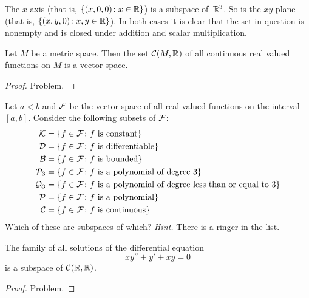 \begin{exam}  The $x$-axis (that is, $\{(x,0,0) \colon x \in \mathbb{R}\}$) is a subspace of~$\mathbb{R}^3$.
So is the $xy$-plane (that is, $\{(x,y,0) \colon x,y \in \mathbb{R}\}$).  In both cases it is clear
that the set in question is nonempty and is closed under addition and scalar multiplication.
\end{exam}

\begin{exam} Let $M$ be a metric space.  Then the set $\mathcal{C}(M,\mathbb{R})$ of all continuous real
valued functions on $M$ is a vector space.
\end{exam}

\begin{proof} Problem.  \ns   \end{proof}

\begin{prob} Let $a < b$ and $\mathcal{F}$ be the vector space of all real valued functions on the
interval $[a,b]$.  Consider the following subsets of $\mathcal{F}$:
 \begin{align*}   \mathcal{K}    &=  \{f \in \mathcal{F} \colon \text{$f$ is constant}\} \\
                  \mathcal{D}    &=  \{f \in \mathcal{F} \colon \text{$f$ is differentiable}\} \\
                  \mathcal{B}    &=  \{f \in \mathcal{F} \colon \text{$f$ is bounded}\} \\
                  \mathcal{P}_3  &=  \{f \in \mathcal{F} \colon \text{$f$ is a polynomial of degree $3$}\} \\
                  \mathcal{Q}_3  &=  \{f \in \mathcal{F} \colon \text{$f$ is a polynomial of degree less
                                                                       than or equal to $3$}\} \\
                  \mathcal{P}    &=  \{f \in \mathcal{F} \colon \text{$f$ is a polynomial}\} \\
                  \mathcal{C}    &=  \{f \in \mathcal{F} \colon \text{$f$ is continuous}\}
 \end{align*}
Which of these are subspaces of which? \emph{Hint.}  There is a ringer in the list.
\end{prob}

\begin{exam} The family of all solutions of the differential equation
   \[ xy'' + y' + xy = 0 \]
is a subspace of $\mathcal{C}(\mathbb{R},\mathbb{R})$.
\end{exam}

\begin{proof} Problem.   \ns   \end{proof}

